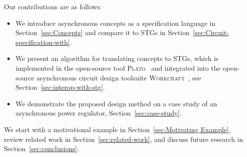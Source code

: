 \documentclass[british, journal]{IEEEtran}
\newcommand{\noun}[1]{\textsc{#1}}
\begin{document}
Our contributions are as follows:
\begin{itemize}
  \item We introduce asynchronous concepts as a specification
  language in Section~\ref{sec:Concepts} and compare it to STGs in
  Section~\ref{sec:Circuit-specification-with}.
  \item We present an algorithm for translating concepts to STGs, which is
  implemented in the open-source tool \noun{Plato}~\cite{2016_concepts_github}
  and integrated into the open-source asynchronous circuit design toolsuite
  \noun{Workcraft}~\cite{Workcraft_website}, see Section~\ref{sec:interop-with-stg}.
  \item We demonstrate the proposed design method on a case study of an
  asynchronous power regulator, Section~\ref{sec:case-study}.
\end{itemize}

\noindent
We start with a motivational example in Section~\ref{sec:Motivating Example}, review related work
in Section~\ref{sec:related-work}, and discuss future research in Section~\ref{sec:conclusions}.




\end{document}
